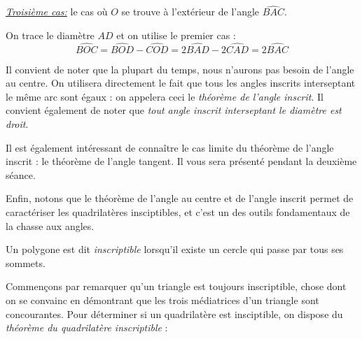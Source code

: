 \begin{preuve}
\underline{\textit{Troisième cas:}} le cas où $O$ se trouve à l'extérieur de l'angle $\widehat{BAC}$.
\begin{figure}[H]
\end{figure}
On trace le diamètre $AD$ et on utilise le premier cas :
$$\widehat{BOC}=\widehat{BOD}-\widehat{COD}=2\widehat{BAD}-2\widehat{CAD}=2\widehat{BAC}$$

\end{preuve}

Il convient de noter que la plupart du temps, nous n'aurons pas besoin de l'angle au centre. On utilisera directement le fait que tous les angles inscrits interseptant le même arc sont égaux : on appelera ceci le \emph{théorème de l'angle inscrit}. Il convient également de noter que \emph{tout angle inscrit interseptant le diamètre est droit}.

Il est également intéressant de connaître le cas limite du théorème de l'angle inscrit : le théorème de l'angle tangent. Il vous sera présenté pendant la deuxième séance.

Enfin, notons que le théorème de l'angle au centre et de l'angle inscrit permet de caractériser les quadrilatères insciptibles, et c'est un des outils fondamentaux de la chasse aux angles.

\begin{dfn}
Un polygone est dit \emph{inscriptible} lorsqu'il existe un cercle qui passe par tous ses sommets.
\end{dfn}

Commençons par remarquer qu'un triangle est toujours inscriptible, chose dont on se convainc en démontrant que les trois médiatrices d'un triangle sont concourantes. Pour déterminer si un quadrilatère est insciptible, on dispose du \emph{théorème du quadrilatère inscriptible} :


